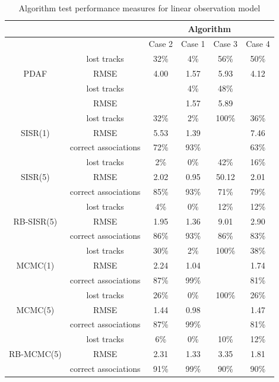 \begin{table}[!p] \centering
\begin{tabular}{|c|c|c|c|c|c|}
\hline
 & & \multicolumn{4}{|c|}{Algorithm} \\
\hline
 & & Case 2 & Case 1 & Case 3 & Case 4 \\
\hline
\multirow{3}{*}{PDAF} & lost tracks             & 32\% & 4\% & 56\% & 50\% \\
                         & RMSE                 & 4.00 & 1.57 & 5.93 & 4.12 \\
\hline
\multirow{3}{*}{JPDAF} & lost tracks            &  & 4\% & 48\% &  \\
                         & RMSE                 &  & 1.57 & 5.89 &  \\
\hline
\multirow{3}{*}{SISR(1)} & lost tracks          & 32\% & 2\% & 100\% & 36\% \\
                         & RMSE                 & 5.53 & 1.39 &  & 7.46 \\
                         & correct associations & 72\% & 93\% &  & 63\% \\
\hline
\multirow{3}{*}{SISR(5)} & lost tracks          & 2\% & 0\% & 42\% & 16\% \\
                         & RMSE                 & 2.02 & 0.95 & 50.12 & 2.01 \\
                         & correct associations & 85\% & 93\% & 71\% & 79\% \\
\hline
\multirow{3}{*}{RB-SISR(5)} & lost tracks       & 4\% & 0\% & 12\% & 12\% \\
                         & RMSE                 & 1.95 & 1.36 & 9.01 & 2.90 \\
                         & correct associations & 86\% & 93\% & 86\% & 83\% \\
\hline
\multirow{3}{*}{MCMC(1)} & lost tracks          & 30\% & 2\% & 100\% & 38\% \\
                         & RMSE                 & 2.24 & 1.04 &  & 1.74 \\
                         & correct associations & 87\% & 99\% &  & 81\% \\
\hline
\multirow{3}{*}{MCMC(5)} & lost tracks          & 26\% & 0\% & 100\% & 26\% \\
                         & RMSE                 & 1.44 & 0.98 &  & 1.47 \\
                         & correct associations & 87\% & 99\% &  & 81\% \\
\hline
\multirow{3}{*}{RB-MCMC(5)} & lost tracks       & 6\% & 0\% & 10\% & 12\% \\
                         & RMSE                 & 2.31 & 1.33 & 3.35 & 1.81 \\
                         & correct associations & 91\% & 99\% & 90\% & 90\% \\
\hline
\end{tabular}
\caption{Algorithm test performance measures for linear observation model}
\label{tab:ResultsLinear}
\end{table}

